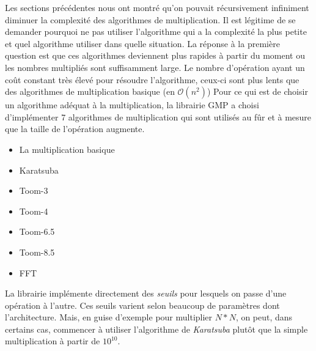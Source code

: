\documentclass[letterpaper]{article}
\begin{document}
Les sections précédentes nous ont montré qu'on pouvait récursivement
infiniment diminuer la complexité des algorithmes de multiplication.
Il est légitime de se demander pourquoi ne pas utiliser l'algorithme
qui a la complexité la plus petite et quel algorithme utiliser dans
quelle situation.
\newline
La réponse à la première question est que ces algorithmes deviennent
plus rapides à partir du moment ou les nombres multipliés sont
suffisamment large. Le nombre d'opération ayant un coût constant
très élevé pour résoudre l'algorithme, ceux-ci sont plus lents
que des algorithmes de multiplication basique (en $\mathcal{O}(n^2)$)
\newline
Pour ce qui est de choisir un algorithme adéquat à la multiplication,
la librairie GMP a choisi d'implémenter 7 algorithmes de multiplication
qui sont utilisés au fûr et à mesure que la taille de l'opération
augmente\cite{gmplibmultiplication}.

\begin{itemize}
  \item La multiplication basique
  \item Karatsuba
  \item Toom-3
  \item Toom-4
  \item Toom-6.5
  \item Toom-8.5
  \item FFT
\end{itemize}

La librairie implémente directement des \emph{seuils} pour lesquels
on passe d'une opération à l'autre. Ces seuils varient selon
beaucoup de paramètres dont l'architecture. Mais, en guise d'exemple
pour multiplier $N*N$, on peut, dans certains cas, commencer à utiliser
l'algorithme de \emph{Karatsuba} plutôt que la simple multiplication
à partir de $10^{10}$\cite{gmplibkaratsuba}.


\footnotesize


\end{document}

